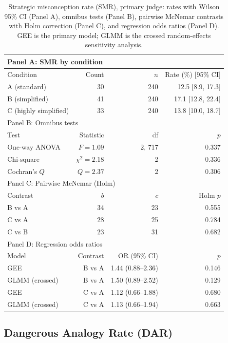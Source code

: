 \documentclass[journal,article,submit,pdftex,moreauthors]{Definitions/mdpi}
\begin{document}
\begin{table}[H]
\caption{Strategic misconception rate (SMR), primary judge: rates with Wilson 95\% CI (Panel A), omnibus tests (Panel B), pairwise McNemar contrasts with Holm correction (Panel C), and regression odds ratios (Panel D). GEE is the primary model; GLMM is the crossed random-effects sensitivity analysis.}
\label{tab:sm}
\centering
\small
\begin{tabular}{lrrr}
\toprule
\multicolumn{4}{l}{Panel A: SMR by condition} \\
\midrule
Condition & Count & $n$ & Rate (\%) [95\% CI] \\
\midrule
A (standard) & 30 & 240 & 12.5 [8.9, 17.3] \\
B (simplified) & 41 & 240 & 17.1 [12.8, 22.4] \\
C (highly simplified) & 33 & 240 & 13.8 [10.0, 18.7] \\
\midrule
\multicolumn{4}{l}{Panel B: Omnibus tests} \\
\midrule
Test & Statistic & df & $p$ \\
\midrule
One-way ANOVA & $F = 1.09$ & 2, 717 & 0.337 \\
Chi-square & $\chi^2 = 2.18$ & 2 & 0.336 \\
Cochran's $Q$ & $Q = 2.37$ & 2 & 0.306 \\
\midrule
\multicolumn{4}{l}{Panel C: Pairwise McNemar (Holm)} \\
\midrule
Contrast & $b$ & $c$ & Holm $p$ \\
\midrule
B vs A & 34 & 23 & 0.555 \\
C vs A & 28 & 25 & 0.784 \\
C vs B & 23 & 31 & 0.682 \\
\midrule
\multicolumn{4}{l}{Panel D: Regression odds ratios} \\
\midrule
Model & Contrast & OR (95\% CI) & $p$ \\
\midrule
GEE & B vs A & 1.44 (0.88--2.36) & 0.146 \\
GLMM (crossed) & B vs A & 1.50 (0.89--2.52) & 0.129 \\
GEE & C vs A & 1.12 (0.66--1.88) & 0.680 \\
GLMM (crossed) & C vs A & 1.13 (0.66--1.94) & 0.663 \\
\bottomrule
\end{tabular}
\end{table}

\subsection{Dangerous Analogy Rate (DAR)}
\end{document}
